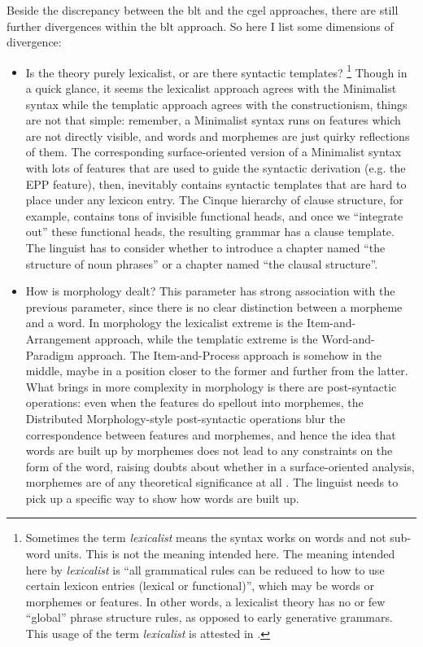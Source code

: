 \documentclass{article}
\newcommand*{\term}[1]{\emph{#1}}
\begin{document}
Beside the discrepancy between the \ac{blt} and the \ac{cgel} approaches,
there are still further divergences within the \ac{blt} approach.
So here I list some dimensions of divergence:
\begin{itemize}
    \item Is the theory purely lexicalist, 
    or are there syntactic templates?%
    \footnote{
        Sometimes the term \term{lexicalist} means the syntax works on words 
        and not sub-word units.
        This is not the meaning intended here. 
        The meaning intended here by \term{lexicalist} is 
        ``all grammatical rules can be reduced to how to use certain lexicon entries (lexical or functional)'',
        which may be words or morphemes or features.
        In other words, a lexicalist theory has no or few ``global'' phrase structure rules,
        as opposed to early generative grammars.
        This usage of the term \term{lexicalist} is attested in \citet{matchin2020cortical}. 
    }
    Though in a quick glance, it seems the lexicalist approach agrees with the Minimalist syntax 
    while the templatic approach agrees with the constructionism,
    things are not that simple:
    remember, a Minimalist syntax runs on features which are not directly visible,
    and words and morphemes are just quirky reflections of them.
    The corresponding surface-oriented version of a Minimalist syntax with lots of features 
    that are used to guide the syntactic derivation (e.g. the EPP feature), then,
    inevitably contains syntactic templates that are hard to place under any lexicon entry.
    The Cinque hierarchy of clause structure, for example, contains tons of invisible functional heads,
    and once we ``integrate out'' these functional heads,
    the resulting grammar has a clause template.
    The linguist has to consider whether to introduce 
    a chapter named ``the structure of noun phrases''
    or a chapter named ``the clausal structure''.

    \item How is morphology dealt?
    This parameter has strong association with the previous parameter, 
    since there is no clear distinction between a morpheme and a word.
    In morphology the lexicalist extreme is the Item-and-Arrangement approach,
    while the templatic extreme is the Word-and-Paradigm approach.
    The Item-and-Process approach is somehow in the middle, 
    maybe in a position closer to the former and further from the latter. 
    What brings in more complexity in morphology is 
    there are post-syntactic operations:
    even when the features do spellout into morphemes,
    the Distributed Morphology-style post-syntactic operations 
    blur the correspondence between features and morphemes,
    and hence the idea that words are built up by morphemes 
    does not lead to any constraints on the form of the word,
    raising doubts about whether in a surface-oriented analysis,
    morphemes are of any theoretical significance at all \citep{anderson2017words}.
    The linguist needs to pick up a specific way to show how words are built up.


\end{itemize}
\end{document}
